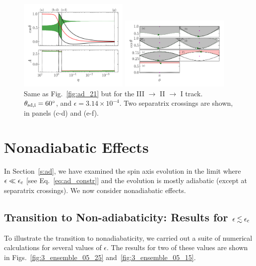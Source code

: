 \begin{figure}
    \centering
    \includegraphics[width=0.47\textwidth]{plots_diskdisp/3testo321.png}

    \includegraphics[width=0.47\textwidth]{plots_diskdisp/3testo321_subplots.png}
    \caption{Same as Fig.~\ref{fig:ad_21} but for the III $\to$ II $\to$ I
    track. $\theta_{\rm sd, i} = 60^\circ$, and $\epsilon = 3.14 \times
    10^{-4}$. Two separatrix crossings are shown, in panels (c-d) and
    (e-f).}\label{fig:ad_321}
\end{figure}


\section{Nonadiabatic Effects}\label{s:nonad}

In Section~\ref{s:ad}, we have examined the spin axis evolution in the limit
where $\epsilon \ll \epsilon_{\rm c}$ [see Eq.~\eqref{eq:ad_constr}] and the
evolution is mostly adiabatic (except at separatrix crossings). We now consider
nonadiabatic effects.

\subsection{Transition to Non-adiabaticity: Results for $\epsilon\lesssim
\epsilon_{\rm c}$}\label{ss:transition}

To illustrate the transition to nonadiabaticity, we carried out a suite of
numerical calculations for several values of $\epsilon$. The results for two of these
values are shown in Figs.~\ref{fig:3_ensemble_05_25}
and~\ref{fig:3_ensemble_05_15}.

